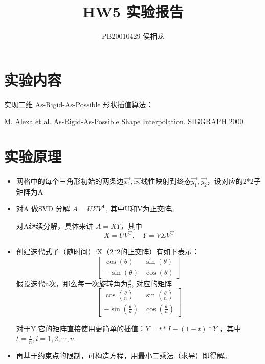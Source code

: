 \documentclass{article}
\title{HW5 实验报告}
\author{PB20010429 侯相龙}
\begin{document}
\maketitle
\section{实验内容}
实现二维 As-Rigid-As-Possible 形状插值算法：

M. Alexa et al. As-Rigid-As-Possible Shape Interpolation. SIGGRAPH 2000


\section{实验原理}
\begin{itemize}
    \item 网格中的每个三角形初始的两条边$\vec{x_1}, \vec{x_2}$线性映射到终态$\vec{y_1}, \vec{y_2}$，设对应的2*2子矩阵为A
    \item 对A 做SVD 分解 $A = U\Sigma V^\text{T}$, 其中U和V为正交阵。
    
    对A继续分解，具体来讲 $A = XY$，其中
    \[X = UV^\text{T}, \quad Y = V\Sigma V^\text{T}\]
    \item 创建迭代式子（随时间）:X（2*2的正交阵）有如下表示：
    \[
        \begin{bmatrix}
            \cos (\theta)  & \sin (\theta) \\
            -\sin (\theta)  & \cos (\theta)
        \end{bmatrix}
    \]
    假设迭代n次，那么每一次旋转角为$\frac{\theta}{n}$, 对应的矩阵
    \[
        \begin{bmatrix}
            \cos (\frac{\theta}{n})  & \sin (\frac{\theta}{n}) \\
            -\sin (\frac{\theta}{n})  & \cos (\frac{\theta}{n})
        \end{bmatrix}
    \]
    
    对于Y,它的矩阵直接使用更简单的插值：$Y = t*I+(1-t)*Y$ ，其中$t = \frac{i}{n}, i=1,2, \cdots,n$
    
    \item 再基于约束点的限制，可构造方程，用最小二乘法（求导）即得解。
\end{itemize}
\end{document}
